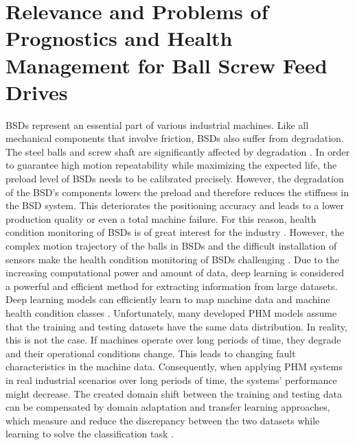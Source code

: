 \section{Relevance and Problems of Prognostics and Health Management for Ball Screw Feed Drives}
BSDs represent an essential part of various industrial machines. Like all mechanical components that involve friction, BSDs also suffer from degradation. The steel balls and screw shaft are significantly affected by degradation \cite{Pandhare2021}. In order to guarantee high motion repeatability while maximizing the expected life, the preload level of BSDs needs to be calibrated precisely. However, the degradation of the BSD's components lowers the preload and therefore reduces the stiffness in the BSD system. This deteriorates the positioning accuracy and leads to a lower production quality or even a total machine failure. For this reason, health condition monitoring of BSDs is of great interest for the industry \cite{Pandhare2021}. However, the complex motion trajectory of the balls in BSDs and the difficult installation of sensors make the health condition monitoring of BSDs challenging \cite{LiPin2018}. Due to the increasing computational power and amount of data, deep learning is considered a powerful and efficient method for extracting information from large datasets. Deep learning models can efficiently learn to map machine data and machine health condition classes \cite{ZHAO2019213}. Unfortunately, many developed PHM models assume that the training and testing datasets have the same data distribution. In reality, this is not the case. If machines operate over long periods of time, they degrade and their operational conditions change. This leads to changing fault characteristics in the machine data. Consequently, when applying PHM systems in real industrial scenarios over long periods of time, the systems' performance might decrease. The created domain shift between the training and testing data can be compensated by domain adaptation and transfer learning approaches, which measure and reduce the discrepancy between the two datasets while learning to solve the classification task \cite{AZAMFAR2020103932}.


